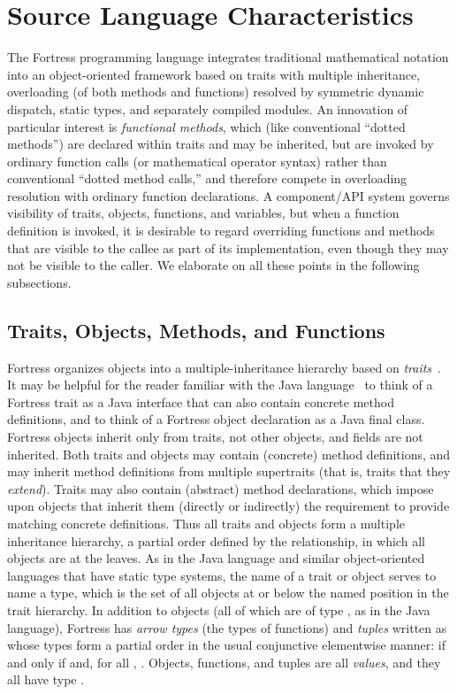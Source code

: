 \section{Source Language Characteristics}

The Fortress programming language integrates traditional mathematical
notation into an object-oriented framework based on traits with
multiple inheritance, overloading (of both methods and functions)
resolved by symmetric dynamic dispatch, static types, and separately
compiled modules.  An innovation of particular interest is
\emph{functional methods}, which (like conventional ``dotted methods'')
are declared within traits and may be inherited, but are invoked by
ordinary function calls (or mathematical operator syntax) rather
than conventional ``dotted method calls,'' and therefore compete
in overloading resolution with ordinary function declarations.
A component/API system governs visibility of traits, objects,
functions, and variables, but when a function definition is invoked,
it is desirable to regard overriding functions and
methods that are visible to the callee as part of its implementation,
even though they may not be visible to the caller.
We elaborate on all these points in the following subsections.

\subsection{Traits, Objects, Methods, and Functions}

Fortress organizes objects into a multiple-inheritance hierarchy based
on {\it traits}~\cite{traits,traitsOOPSLA04}.  It may be helpful for the reader familiar with the Java language~\cite{JLS1}
to think of a Fortress trait as a Java interface that can
also contain concrete method definitions, and
to think of a Fortress object declaration as a Java final class.
Fortress objects inherit only from traits, not other objects,
and fields are not inherited.  Both traits and objects may contain
(concrete) method definitions, and may inherit method definitions
from multiple supertraits (that is, traits that they \emph{extend}).
Traits may also contain (abstract) method declarations, which impose
upon objects that inherit them (directly or indirectly)
the requirement to provide matching concrete definitions.
Thus all traits and objects form a multiple inheritance hierarchy,
a partial order defined by the  relationship,
in which all objects are at the leaves.  As in the Java language and similar object-oriented
languages that have static type systems, the name of a trait or object
serves to name a type, which is the set of all objects at or below
the named position in the trait hierarchy.  In addition to objects
(all of which are of type , as in the Java language), Fortress has
\emph{arrow types}  (the types of functions) and \emph{tuples}
written as  whose types form a partial order
in the usual conjunctive elementwise manner:
 if and only if
 and, for all , .  Objects, functions, and tuples
are all \emph{values}, and they all have type .

